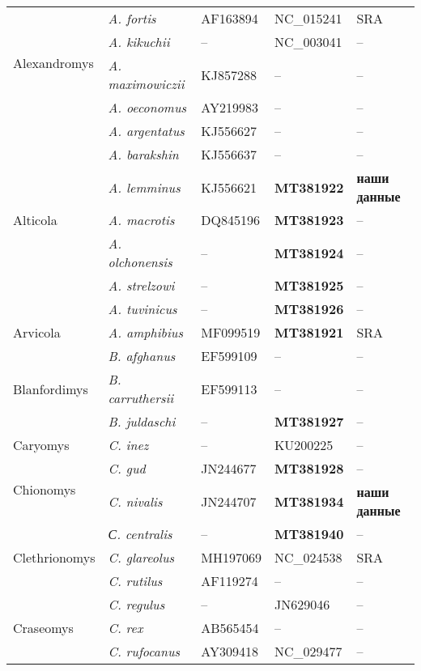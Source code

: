 \begin{landscape}
\begin{center}
\begin{longtable}{|p{3.5cm}|p{4.5cm}|p{4.0cm}|p{6.5cm}|p{4.5cm}|}
\multirow{4}{*}{Alexandromys} & \textit{A. fortis} & AF163894 & NC\_015241 & SRA\\ \cline{2-5}
& \textit{A. kikuchii} & -- & NC\_003041 & --\\ \cline{2-5}
& \textit{A. maximowiczii} & KJ857288 & -- & --\\ \cline{2-5}
& \textit{A. oeconomus} & AY219983 & -- & --\\ \hline
\multirow{7}{*}{Alticola} & \textit{A. argentatus} & KJ556627 & -- & --\\ \cline{2-5}
& \textit{A. barakshin} & KJ556637  & -- & --\\ \cline{2-5}
& \textit{A. lemminus} & KJ556621 & \textbf{MT381922} & \textbf{наши данные}\\ \cline{2-5}
& \textit{A. macrotis} & DQ845196 & \textbf{MT381923} & --\\ \cline{2-5}
& \textit{A. olchonensis} & -- & \textbf{MT381924} & --\\ \cline{2-5}
& \textit{A. strelzowi} & -- & \textbf{MT381925} & --\\ \cline{2-5}
& \textit{A. tuvinicus} & -- & \textbf{MT381926} & --\\ \hline
Arvicola & \textit{A. amphibius} & MF099519  & \textbf{MT381921} & SRA\\ \hline
\multirow{3}{*}{Blanfordimys} & \textit{B. afghanus} & EF599109 & -- & --\\ \cline{2-5}
& \textit{B. carruthersii} & EF599113 & -- & --\\ \cline{2-5}
& \textit{B. juldaschi} & -- & \textbf{MT381927} & --\\ \hline
Caryomys & \textit{C. inez} & -- & KU200225 & --\\ \hline
\multirow{2}{*}{Chionomys} & \textit{C. gud} & JN244677 & \textbf{MT381928} & --\\ \cline{2-5}
& \textit{C. nivalis} & JN244707 & \textbf{MT381934} & \textbf{наши данные}\\ \hline
\multirow{3}{*}{Clethrionomys} & \textit{С. centralis} & -- & \textbf{MT381940} & --\\ \cline{2-5}
& \textit{C. glareolus} & MH197069 & NC\_024538 & SRA\\ \cline{2-5}
& \textit{C. rutilus} & AF119274 & -- & --\\ \hline
\multirow{3}{*}{Craseomys} & \textit{C. regulus} & -- & JN629046 & -- \\ \cline{2-5}
& \textit{C. rex} & AB565454 & -- & --\\ \cline{2-5}
& \textit{C. rufocanus} & AY309418 & NC\_029477 & --\\ \hline

\end{longtable}
\end{center}
\end{landscape}

